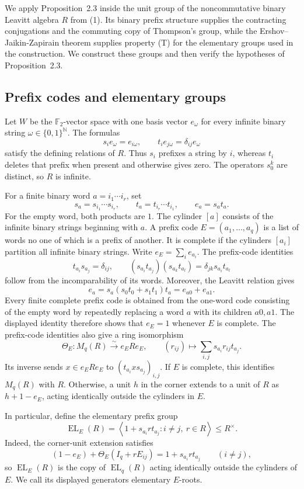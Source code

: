 \documentclass[10pt]{article}
\newcommand{\F}{\mathbb{F}}
\newcommand{\N}{\mathbb{N}}
\newcommand{\EL}{\operatorname{EL}}
\newcommand{\angles}[1]{\left\langle #1\right\rangle}
\begin{document}
We apply Proposition~2.3 inside the unit group of the noncommutative binary Leavitt algebra $R$ from (1). Its binary prefix structure supplies the contracting conjugations and the commuting copy of Thompson's group, while the Ershov--Jaikin-Zapirain theorem supplies property (T) for the elementary groups used in the construction. We construct these groups and then verify the hypotheses of Proposition~2.3.

\subsection{Prefix codes and elementary groups}
Let $W$ be the $\F_2$-vector space with one basis vector $e_\omega$ for every infinite binary string $\omega\in\{0,1\}^{\N}$. The formulas
\[
s_i e_\omega=e_{i\omega},\qquad t_i e_{j\omega}=\delta_{ij}e_\omega
\]
satisfy the defining relations of $R$. Thus $s_i$ prefixes a string by $i$, whereas $t_i$ deletes that prefix when present and otherwise gives zero. The operators $s_0^k$ are distinct, so $R$ is infinite.

For a finite binary word $a=i_1\cdots i_r$, set
\[
s_a=s_{i_1}\cdots s_{i_r},\qquad t_a=t_{i_r}\cdots t_{i_1},\qquad e_a=s_at_a.
\]
For the empty word, both products are $1$. The cylinder $[a]$ consists of the infinite binary strings beginning with $a$. A prefix code $E=(a_1,\ldots,a_q)$ is a list of words no one of which is a prefix of another. It is complete if the cylinders $[a_i]$ partition all infinite binary strings. Write $e_E=\sum_i e_{a_i}$. The prefix-code identities
\[
t_{a_i}s_{a_j}=\delta_{ij},\qquad
(s_{a_i}t_{a_j})(s_{a_k}t_{a_l})=\delta_{jk}s_{a_i}t_{a_l}
\]
follow from the incomparability of its words. Moreover, the Leavitt relation gives
\[
e_a=s_a(s_0t_0+s_1t_1)t_a=e_{a0}+e_{a1}.
\]
Every finite complete prefix code is obtained from the one-word code consisting of the empty word by repeatedly replacing a word $a$ with its children $a0,a1$. The displayed identity therefore shows that $e_E=1$ whenever $E$ is complete. The prefix-code identities also give a ring isomorphism
\[
\Theta_E:M_q(R)\xrightarrow{\sim}e_ERe_E,
\qquad
(r_{ij})\longmapsto\sum_{i,j}s_{a_i}r_{ij}t_{a_j}.
\]
Its inverse sends $x\in e_ERe_E$ to $(t_{a_i}xs_{a_j})_{i,j}$. If $E$ is complete, this identifies $M_q(R)$ with $R$. Otherwise, a unit $h$ in the corner extends to a unit of $R$ as $h+1-e_E$, acting identically outside the cylinders in $E$.

In particular, define the elementary prefix group
\[
\EL_E(R)=\angles{1+s_{a_i}rt_{a_j}:i\neq j,\ r\in R}\leq R^\times.
\]
Indeed, the corner-unit extension satisfies
\[
(1-e_E)+\Theta_E(I_q+rE_{ij})=1+s_{a_i}rt_{a_j}\qquad(i\neq j),
\]
so $\EL_E(R)$ is the copy of $\EL_q(R)$ acting identically outside the cylinders of $E$. We call its displayed generators elementary $E$-roots.
\end{document}

